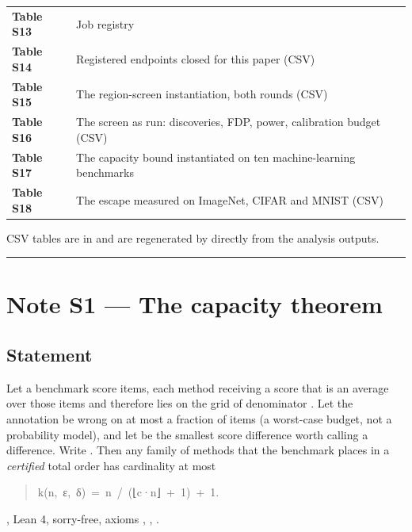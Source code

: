 \begin{center}
\begin{tabular}{ll}
\textbf{Table S13} & Job registry \\
\textbf{Table S14} & Registered endpoints closed for this paper (CSV) \\
\textbf{Table S15} & The region-screen instantiation, both rounds (CSV) \\
\textbf{Table S16} & The screen as run: discoveries, FDP, power, calibration budget (CSV) \\
\textbf{Table S17} & The capacity bound instantiated on ten machine-learning benchmarks \\
\textbf{Table S18} & The escape measured on ImageNet, CIFAR and MNIST (CSV) \\
\bottomrule
\end{tabular}
\end{center}

CSV tables are in  and are regenerated by
 directly from the analysis outputs.


\vspace{0.5em}\hrule\vspace{0.8em}



\section*{Note S1 --- The capacity theorem}


\subsection*{Statement}

Let a benchmark score  items, each method receiving a score that is an
average over those items and therefore lies on the grid of denominator . Let
the annotation be wrong on at most a fraction  of items (a worst-case budget,
not a probability model), and let  be the smallest score difference worth
calling a difference. Write . Then any family of methods that
the benchmark places in a \emph{certified} total order has cardinality at most

\begin{quote}\ttfamily\footnotesize\begin{flushleft}
k(n,~ε,~δ)~=~n~/~(⌊c·n⌋~+~1)~+~1.\\
\end{flushleft}\end{quote}

, Lean 4, sorry-free, axioms
, , .

